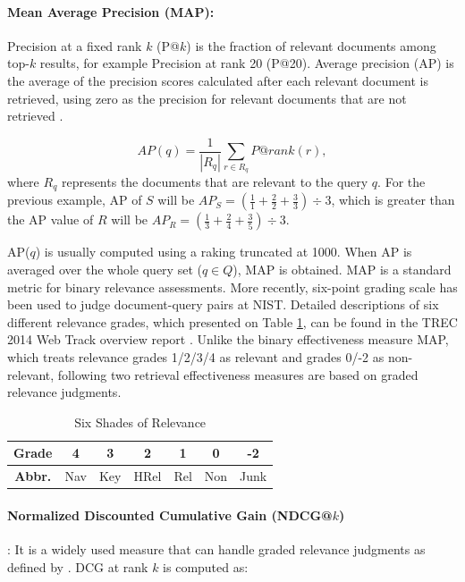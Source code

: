 \paragraph{Mean Average Precision (MAP):} Precision at a fixed rank $k$ (P@$k$) is the fraction of relevant documents among top-$k$ results, for example Precision at rank 20 (P@20).
Average precision (AP) is the average of the precision scores calculated after each relevant document is retrieved, using zero as the precision for relevant documents that are not retrieved \citep{MAP}.

\begin{equation} \label{eq:map}
AP(q) =  \frac{1}{|R_q|} \sum\limits_{r \in R_q} P@rank(r),
\end{equation}
where $R_q$ represents the documents that are relevant to the query $q$.
For the previous example, AP of $S$ will be $AP_S = \left( \frac{1}{1}+\frac{2}{2}+\frac{3}{3} \right) \div 3$, which is greater than the AP value of $R$ will be $AP_R = \left( \frac{1}{3}+\frac{2}{4}+\frac{3}{5} \right) \div 3$.

AP($q$) is usually computed using a raking truncated at 1000.
When AP is averaged over the whole query set ($q \in Q$), MAP is obtained.
MAP is a standard metric for binary relevance assessments.
More recently, six-point grading scale has been used to judge document-query pairs at NIST.
Detailed descriptions of six different relevance grades, which presented on Table \ref{tbl:levels}, can be found in the TREC 2014 Web Track overview report \citep{2014web}.
Unlike the binary effectiveness measure MAP, which treats relevance grades 1/2/3/4 as relevant and grades 0/-2 as non-relevant, following two retrieval effectiveness measures are based on graded relevance judgments.

\begin{table}
\caption{Six Shades of Relevance}
\label{tbl:levels}
\centering
\begin{tabular}{| c | c | c |  c | c |  c | c |}
\hline 
\bfseries  Grade &  4 & 3 & 2 & 1 & 0 & -2 \\
\hline 
\bfseries Abbr. & Nav &Key & HRel & Rel & Non & Junk \\
\hline
\end{tabular}
\end{table}

\paragraph{Normalized Discounted Cumulative Gain (NDCG@$k$)}: It is a widely used measure that can handle graded relevance judgments as defined by \citet*{ndcg}.
DCG at rank $k$ is computed as:

